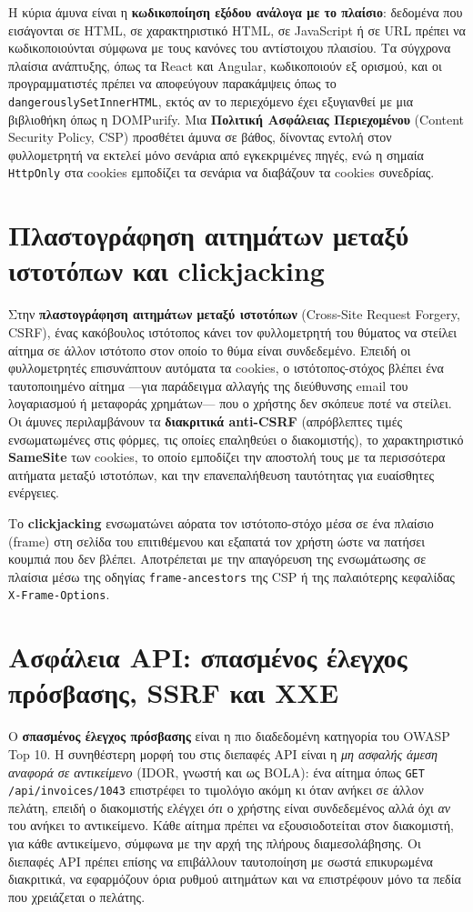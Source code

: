 \documentclass[11pt,openany]{book}
\begin{document}
Η κύρια άμυνα είναι η \textbf{κωδικοποίηση εξόδου ανάλογα με το πλαίσιο}: δεδομένα που εισάγονται σε HTML, σε χαρακτηριστικό HTML, σε JavaScript ή σε URL πρέπει να κωδικοποιούνται σύμφωνα με τους κανόνες του αντίστοιχου πλαισίου. Τα σύγχρονα πλαίσια ανάπτυξης, όπως τα React και Angular, κωδικοποιούν εξ ορισμού, και οι προγραμματιστές πρέπει να αποφεύγουν παρακάμψεις όπως το \texttt{dangerouslySetInnerHTML}, εκτός αν το περιεχόμενο έχει εξυγιανθεί με μια βιβλιοθήκη όπως η DOMPurify. Μια \textbf{Πολιτική Ασφάλειας Περιεχομένου} (Content Security Policy, CSP) προσθέτει άμυνα σε βάθος, δίνοντας εντολή στον φυλλομετρητή να εκτελεί μόνο σενάρια από εγκεκριμένες πηγές, ενώ η σημαία \texttt{HttpOnly} στα cookies εμποδίζει τα σενάρια να διαβάζουν τα cookies συνεδρίας.

\section{Πλαστογράφηση αιτημάτων μεταξύ ιστοτόπων και clickjacking}\label{sec:9.4}
Στην \textbf{πλαστογράφηση αιτημάτων μεταξύ ιστοτόπων} (Cross-Site Request Forgery, CSRF), ένας κακόβουλος ιστότοπος κάνει τον φυλλομετρητή του θύματος να στείλει αίτημα σε άλλον ιστότοπο στον οποίο το θύμα είναι συνδεδεμένο. Επειδή οι φυλλομετρητές επισυνάπτουν αυτόματα τα cookies, ο ιστότοπος-στόχος βλέπει ένα ταυτοποιημένο αίτημα —για παράδειγμα αλλαγής της διεύθυνσης email του λογαριασμού ή μεταφοράς χρημάτων— που ο χρήστης δεν σκόπευε ποτέ να στείλει. Οι άμυνες περιλαμβάνουν τα \textbf{διακριτικά anti-CSRF} (απρόβλεπτες τιμές ενσωματωμένες στις φόρμες, τις οποίες επαληθεύει ο διακομιστής), το χαρακτηριστικό \textbf{SameSite} των cookies, το οποίο εμποδίζει την αποστολή τους με τα περισσότερα αιτήματα μεταξύ ιστοτόπων, και την επανεπαλήθευση ταυτότητας για ευαίσθητες ενέργειες.

Το \textbf{clickjacking} ενσωματώνει αόρατα τον ιστότοπο-στόχο μέσα σε ένα πλαίσιο (frame) στη σελίδα του επιτιθέμενου και εξαπατά τον χρήστη ώστε να πατήσει κουμπιά που δεν βλέπει. Αποτρέπεται με την απαγόρευση της ενσωμάτωσης σε πλαίσια μέσω της οδηγίας \texttt{frame-ancestors} της CSP ή της παλαιότερης κεφαλίδας \texttt{X-Frame-Options}.

\section{Ασφάλεια API: σπασμένος έλεγχος πρόσβασης, SSRF και XXE}\label{sec:9.5}
Ο \textbf{σπασμένος έλεγχος πρόσβασης} είναι η πιο διαδεδομένη κατηγορία του OWASP Top 10. Η συνηθέστερη μορφή του στις διεπαφές API είναι η \emph{μη ασφαλής άμεση αναφορά σε αντικείμενο} (IDOR, γνωστή και ως BOLA): ένα αίτημα όπως \texttt{GET /api/invoices/1043} επιστρέφει το τιμολόγιο ακόμη κι όταν ανήκει σε άλλον πελάτη, επειδή ο διακομιστής ελέγχει \emph{ότι} ο χρήστης είναι συνδεδεμένος αλλά όχι \emph{αν} του ανήκει το αντικείμενο. Κάθε αίτημα πρέπει να εξουσιοδοτείται στον διακομιστή, για κάθε αντικείμενο, σύμφωνα με την αρχή της πλήρους διαμεσολάβησης. Οι διεπαφές API πρέπει επίσης να επιβάλλουν ταυτοποίηση με σωστά επικυρωμένα διακριτικά, να εφαρμόζουν όρια ρυθμού αιτημάτων και να επιστρέφουν μόνο τα πεδία που χρειάζεται ο πελάτης.
\end{document}
